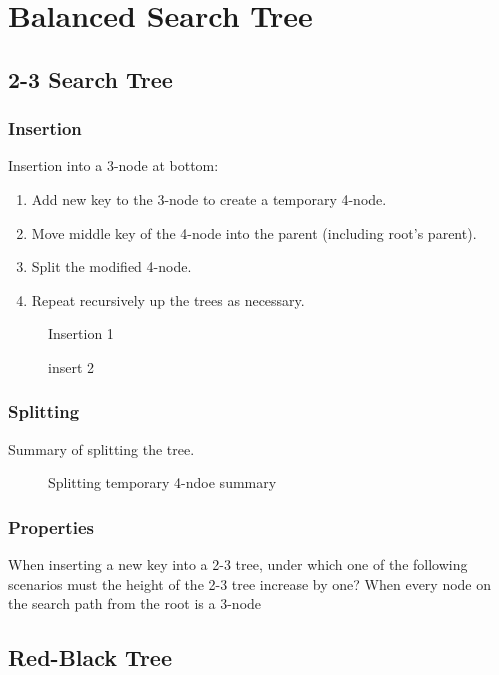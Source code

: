 \chapter{Balanced Search Tree}
\section{2-3 Search Tree}
\subsection{Insertion}
Insertion into a 3-node at bottom:
\begin{enumerate}
\item Add new key to the 3-node to create a temporary 4-node.
\item Move middle key of the 4-node into the parent (including root's parent).
\item Split the modified 4-node.
\item Repeat recursively up the trees as necessary.
\end{enumerate}
\begin{figure}[hbtp]
\centering
{}
\caption{Insertion 1}
\label{fig:LABEL}
\end{figure}

\begin{figure}[hbtp]
\centering
{}
\caption{insert 2}
\label{fig:LABEL}
\end{figure}

\subsection{Splitting}
Summary of splitting the tree. 
\begin{figure}[hbtp]
\centering
{}
\caption{Splitting temporary 4-ndoe summary}
\label{fig:splitting}
\end{figure}

\subsection{Properties}
When inserting a new key into a 2-3 tree, under which one of the following scenarios must the height of the 2-3 tree increase by one? When every node on the search path from the root is a 3-node

\section{Red-Black Tree}
